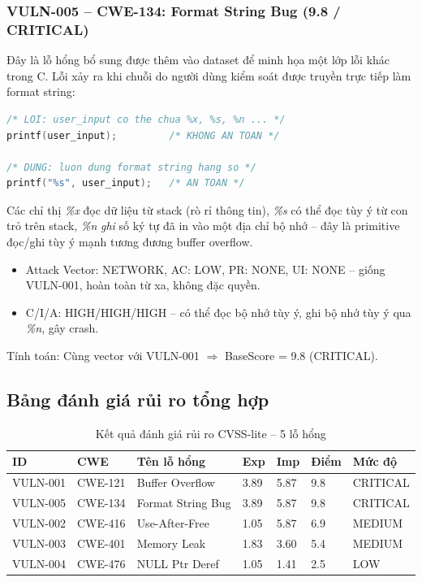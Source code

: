 \subsubsection{VULN-005 -- CWE-134: Format String Bug (9.8 / CRITICAL)}

Đây là lỗ hổng bổ sung được thêm vào dataset để minh họa một lớp lỗi khác
trong C. Lỗi xảy ra khi chuỗi do người dùng kiểm soát được truyền trực tiếp
làm format string:

\begin{lstlisting}[language=C, caption={Ví dụ lỗi format string -- không bao giờ làm thế này}]
/* LOI: user_input co the chua %x, %s, %n ... */
printf(user_input);         /* KHONG AN TOAN */

/* DUNG: luon dung format string hang so */
printf("%s", user_input);   /* AN TOAN */
\end{lstlisting}

Các chỉ thị \textit{\%x} đọc dữ liệu từ stack (rò rỉ thông tin), \textit{\%s}
có thể đọc tùy ý từ con trỏ trên stack, \textit{\%n} \emph{ghi} số ký tự đã in
vào một địa chỉ bộ nhớ -- đây là primitive đọc/ghi tùy ý mạnh tương đương buffer
overflow.

\begin{itemize}
    \item Attack Vector: NETWORK, AC: LOW, PR: NONE, UI: NONE -- giống VULN-001,
          hoàn toàn từ xa, không đặc quyền.
    \item C/I/A: HIGH/HIGH/HIGH -- có thể đọc bộ nhớ tùy ý, ghi bộ nhớ tùy ý
          qua \textit{\%n}, gây crash.
\end{itemize}

Tính toán: Cùng vector với VULN-001 $\Rightarrow$ BaseScore = 9.8 (CRITICAL).

\subsection{Bảng đánh giá rủi ro tổng hợp}

\begin{table}[H]
\centering
\begin{tabularx}{\textwidth}{|p{1.6cm}|p{1.7cm}|X|p{0.9cm}|p{1.3cm}|p{1.2cm}|p{1.3cm}|}
\hline
\textbf{ID} & \textbf{CWE} & \textbf{Tên lỗ hổng} & \textbf{Exp} & \textbf{Imp} & \textbf{Điểm} & \textbf{Mức độ} \\ \hline
VULN-001 & CWE-121 & Buffer Overflow & 3.89 & 5.87 & 9.8 & CRITICAL \\ \hline
VULN-005 & CWE-134 & Format String Bug & 3.89 & 5.87 & 9.8 & CRITICAL \\ \hline
VULN-002 & CWE-416 & Use-After-Free & 1.05 & 5.87 & 6.9 & MEDIUM \\ \hline
VULN-003 & CWE-401 & Memory Leak & 1.83 & 3.60 & 5.4 & MEDIUM \\ \hline
VULN-004 & CWE-476 & NULL Ptr Deref & 1.05 & 1.41 & 2.5 & LOW \\ \hline
\end{tabularx}
\caption{Kết quả đánh giá rủi ro CVSS-lite -- 5 lỗ hổng}
\end{table}


